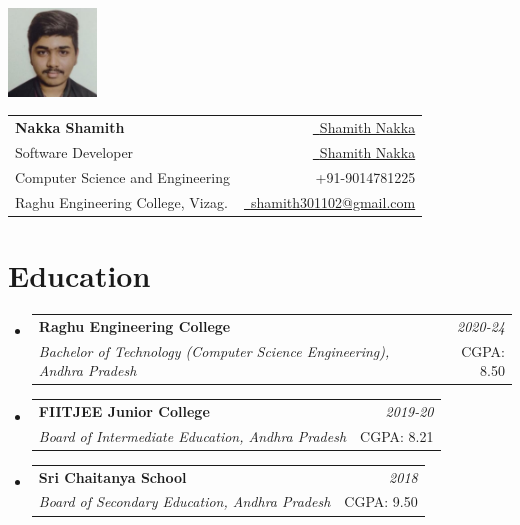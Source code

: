 \documentclass[a4paper,11pt]{article}
\makeatletter
\newcommand{\resumeSubheading}[4]{
\vspace{0.5mm}\item
    \begin{tabular*}{0.98\textwidth}[t]{l@{\extracolsep{\fill}}r}
        \textbf{#1} & \textit{\footnotesize{#4}} \\
        \textit{\footnotesize{#3}} &  \footnotesize{#2}\\
    \end{tabular*}
    \vspace{-2.4mm}
}
\newcommand{\resumeSubHeadingListStart}{\begin{itemize}[leftmargin=*,labelsep=0mm]}
\newcommand{\resumeSubHeadingListEnd}{\end{itemize}\vspace{2mm}}
\newcommand{\name}{Nakka Shamith} %
\newcommand{\course}{Bachelor of Technology} %
\newcommand{\role}{Software Developer} %
\newcommand{\phone}{9014781225} %
\newcommand{\emaila}{shamith301102@gmail.com} %
\makeatother
\begin{document}
\selectfont


\parbox{\dimexpr\linewidth-2.45cm\relax}{
\parbox{2.6cm}{%
\includegraphics[width=2.35cm,clip]{photo.jpeg}
}
\begin{tabularx}{\linewidth}{L r} \\
  \textbf{\Large \name} & \href{https://github.com/iamwatchdogs/}{\raisebox{0.0\height}{\footnotesize \faGithub}\ {Shamith Nakka}} \\
  {\role} & \href{https://www.linkedin.com/in/shamith-nakka}{\raisebox{0.0\height}{\footnotesize \faLinkedin}\ {Shamith Nakka}} \\
  {Computer Science and Engineering} & {\raisebox{0.0\height}{\footnotesize \faPhone}\ +91-\phone}\\
  {Raghu Engineering College, Vizag.} & \href{mailto:\emaila}{\raisebox{0.0\height}{\footnotesize \faEnvelope}\ {\emaila}} 
\end{tabularx}
}
\vspace{-2.5mm}


\section{\textbf{Education}}
  \resumeSubHeadingListStart
    \resumeSubheading
      {Raghu Engineering College}{CGPA: 8.50}
      {Bachelor of Technology (Computer Science Engineering), Andhra Pradesh}{2020-24}
    \resumeSubheading
      {FIITJEE Junior College}{CGPA: 8.21}
      {Board of Intermediate Education, Andhra Pradesh}{2019-20}
    \resumeSubheading
      {Sri Chaitanya School}{CGPA: 9.50}
      {Board of Secondary Education, Andhra Pradesh}{2018}
  \resumeSubHeadingListEnd
\vspace{-5.5mm}
%



\end{document}
